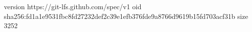 version https://git-lfs.github.com/spec/v1
oid sha256:fd1a1e9531fbc8fd27232def2c39e1efb376fde9a8766d9619b15fd703acf31b
size 3252
